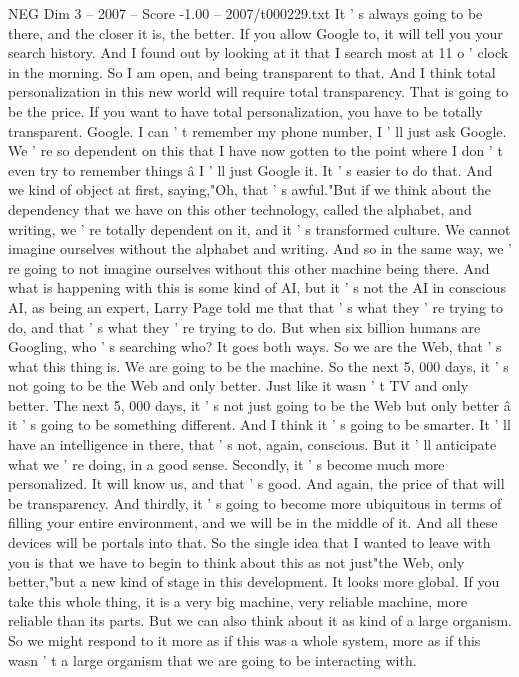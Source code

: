 \begin{textsample}{NEG Dim 3 – 2007 – Score -1.00 – 2007/t000229.txt}
It ' s always going to be there, and the closer it is, the better.
If you allow Google to, it will tell you your search history.
And I found out by looking at it that I search most at 11 o ' clock in the morning.
So I am open, and being transparent to that.
And I think total personalization in this new world will require total transparency.
That is going to be the price.
If you want to have total personalization, you have to be totally transparent.
Google.
I can ' t remember my phone number, I ' ll just ask Google.
We ' re so dependent on this that I have now gotten to the point where I don ' t even try to remember things â I ' ll just Google it.
It ' s easier to do that.
And we kind of object at first, saying,"Oh, that ' s awful."But if we think about the dependency that we have on this other technology, called the alphabet, and writing, we ' re totally dependent on it, and it ' s transformed culture.
We cannot imagine ourselves without the alphabet and writing.
And so in the same way, we ' re going to not imagine ourselves without this other machine being there.
And what is happening with this is some kind of AI, but it ' s not the AI in conscious AI, as being an expert, Larry Page told me that that ' s what they ' re trying to do, and that ' s what they ' re trying to do.
But when six billion humans are Googling, who ' s searching who?
It goes both ways.
So we are the Web, that ' s what this thing is.
We are going to be the machine.
So the next 5, 000 days, it ' s not going to be the Web and only better.
Just like it wasn ' t TV and only better.
The next 5, 000 days, it ' s not just going to be the Web but only better â it ' s going to be something different.
And I think it ' s going to be smarter.
It ' ll have an intelligence in there, that ' s not, again, conscious.
But it ' ll anticipate what we ' re doing, in a good sense.
Secondly, it ' s become much more personalized.
It will know us, and that ' s good.
And again, the price of that will be transparency.
And thirdly, it ' s going to become more ubiquitous in terms of filling your entire environment, and we will be in the middle of it.
And all these devices will be portals into that.
So the single idea that I wanted to leave with you is that we have to begin to think about this as not just"the Web, only better,"but a new kind of stage in this development.
It looks more global.
If you take this whole thing, it is a very big machine, very reliable machine, more reliable than its parts.
But we can also think about it as kind of a large organism.
So we might respond to it more as if this was a whole system, more as if this wasn ' t a large organism that we are going to be interacting with.

\end{textsample}
